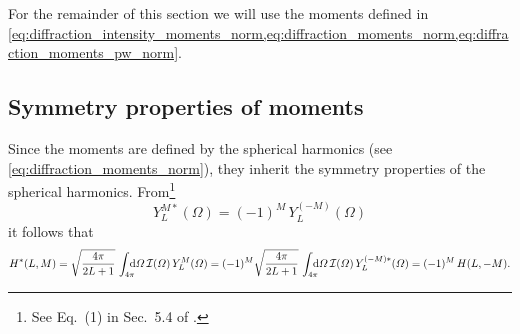 For the remainder of this section we will use the moments defined in
\cref{eq:diffraction_intensity_moments_norm,eq:diffraction_moments_norm,eq:diffraction_moments_pw_norm}.


\subsection{Symmetry properties of moments}%
\label{sec:diffraction:moments_sym}

Since the moments are defined by the spherical harmonics (see
\cref{eq:diffraction_moments_norm}), they inherit the symmetry properties
of the spherical harmonics.  From\footnote{See Eq.~(1) in Sec.~5.4 of
.}
\begin{equation}
  \label{eq:spherical_harm_sym}
  Y_L^{M *}(\Omega)
  = (-1)^M\, Y_L^{(-M)}(\Omega)
\end{equation}
it follows that
\begin{equation}
  \label{eq:diffraction_moment_sym_1}
  H^*(L, M)
  = \sqrt{\frac{4 \pi}{2 L + 1}}\, \int_{4 \pi}\!\!\!\! \dif{\Omega}\, \intensity(\Omega)\, Y_L^M(\Omega)
  = (-1)^M \sqrt{\frac{4 \pi}{2 L + 1}}\, \int_{4 \pi}\!\!\!\! \dif{\Omega}\, \intensity(\Omega)\, Y_L^{(-M) *}(\Omega)
  = (-1)^M\, H(L, -M).
\end{equation}

